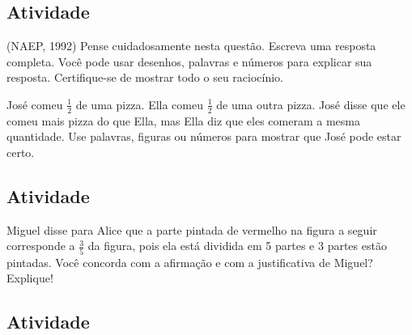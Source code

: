 \subsection{Atividade}

(NAEP, 1992) Pense cuidadosamente nesta questão. Escreva uma resposta completa. Você pode usar desenhos, palavras e números para explicar sua resposta. Certifique-se de mostrar todo o seu raciocínio.

José comeu $\frac{1}{2}$ de uma pizza. Ella comeu $\frac{1}{2}$ de uma outra pizza. José disse que ele comeu mais pizza do que Ella, mas Ella diz que eles comeram a mesma quantidade. Use palavras, figuras ou números para mostrar que José pode estar certo.

\subsection{Atividade}

Miguel disse para Alice que a parte pintada de vermelho na figura a seguir corresponde a $\frac{3}{5}$ da figura, pois ela está dividida em 5 partes e 3 partes estão pintadas. Você concorda com a afirmação e com a justificativa de Miguel? Explique!

\begin{center}
\end{center}

\subsection{Atividade}

